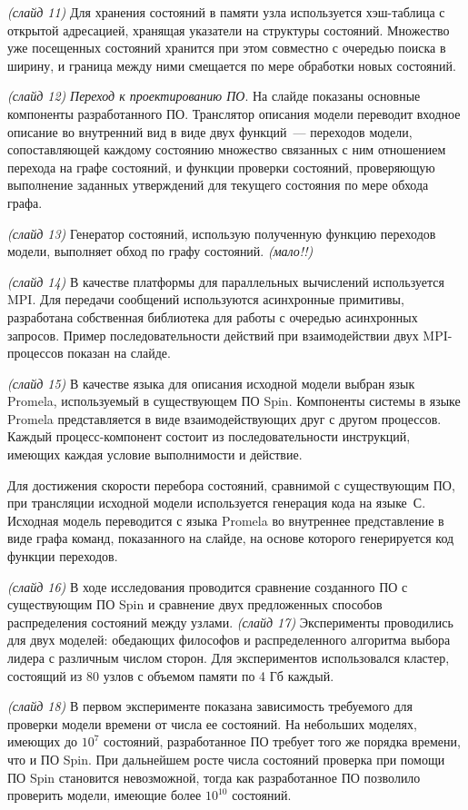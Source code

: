 \documentclass[a4paper,12pt,notitlepage]{article}
\begin{document}
\emph{(слайд 11)} Для хранения состояний в памяти узла используется хэш-таблица с открытой
адресацией, хранящая указатели на структуры состояний. Множество уже посещенных состояний
хранится при этом совместно с очередью поиска в ширину, и граница между ними смещается по
мере обработки новых состояний.

\emph{(слайд 12)} \emph{Переход к проектированию ПО}. На слайде показаны основные
компоненты разработанного ПО. Транслятор описания модели переводит входное описание во
внутренний вид в виде двух функций~--- переходов модели, сопоставляющей каждому состоянию
множество связанных с ним отношением перехода на графе состояний, и функции проверки
состояний, проверяющую выполнение заданных утверждений для текущего состояния по мере
обхода графа.

\emph{(слайд 13)} Генератор состояний, использую полученную функцию переходов модели,
выполняет обход по графу состояний. \emph{(мало!!)}

\emph{(слайд 14)} В качестве платформы для параллельных вычислений используется MPI. Для
передачи сообщений используются асинхронные примитивы, разработана собственная библиотека
для работы с очередью асинхронных запросов. Пример последовательности действий при
взаимодействии двух MPI-процессов показан на слайде.

\emph{(слайд 15)} В качестве языка для описания исходной модели выбран язык Promela,
используемый в существующем ПО Spin. Компоненты системы в языке Promela представляется в
виде взаимодействующих друг с другом процессов. Каждый процесс-компонент состоит из
последовательности инструкций, имеющих каждая условие выполнимости и действие.

Для достижения скорости перебора состояний, сравнимой с существующим ПО, при трансляции
исходной модели используется генерация кода на языке~С. Исходная модель переводится с
языка Promela во внутреннее представление в виде графа команд, показанного на слайде, на
основе которого генерируется код функции переходов.

\emph{(слайд 16)} В ходе исследования проводится сравнение созданного ПО с существующим ПО
Spin и сравнение двух предложенных способов распределения состояний между
узлами. \emph{(слайд 17)} Эксперименты проводились для двух моделей: обедающих философов и
распределенного алгоритма выбора лидера с различным числом сторон. Для экспериментов
использовался кластер, состоящий из 80 узлов с объемом памяти по 4 Гб каждый.

\emph{(слайд 18)} В первом эксперименте показана зависимость требуемого для проверки
модели времени от числа ее состояний. На небольших моделях, имеющих до $10^7$ состояний,
разработанное ПО требует того же порядка времени, что и ПО Spin. При дальнейшем росте
числа состояний проверка при помощи ПО Spin становится невозможной, тогда как
разработанное ПО позволило проверить модели, имеющие более $10^{10}$ состояний.
\end{document}
